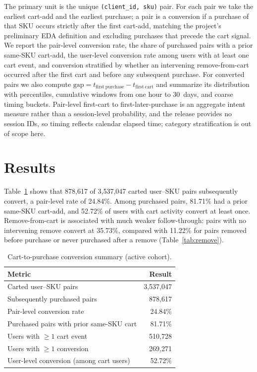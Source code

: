 \documentclass[11pt]{article}
\begin{document}
The primary unit is the unique \texttt{(client\_id, sku)} pair. For each pair we take the earliest cart-add and the earliest purchase; a pair is a conversion if a purchase of that SKU occurs strictly after the first cart-add, matching the project's preliminary EDA definition and excluding purchases that precede the cart signal. We report the pair-level conversion rate, the share of purchased pairs with a prior same-SKU cart-add, the user-level conversion rate among users with at least one cart event, and conversion stratified by whether an intervening remove-from-cart occurred after the first cart and before any subsequent purchase. For converted pairs we also compute $\mathrm{gap}=t_{\mathrm{first\ purchase}}-t_{\mathrm{first\ cart}}$ and summarize its distribution with percentiles, cumulative windows from one hour to 30~days, and coarse timing buckets. Pair-level first-cart to first-later-purchase is an aggregate intent measure rather than a session-level probability, and the release provides no session IDs, so timing reflects calendar elapsed time; category stratification is out of scope here.

\section{Results}
Table~\ref{tab:conversion} shows that 878,617 of 3,537,047 carted user--SKU pairs subsequently convert, a pair-level rate of 24.84\%. Among purchased pairs, 81.71\% had a prior same-SKU cart-add, and 52.72\% of users with cart activity convert at least once. Remove-from-cart is associated with much weaker follow-through: pairs with no intervening remove convert at 35.73\%, compared with 11.22\% for pairs removed before purchase or never purchased after a remove (Table~\ref{tab:remove}).

\begin{table}[h]
\centering
\caption{Cart-to-purchase conversion summary (active cohort).}
\label{tab:conversion}
\begin{tabular}{lr}
\toprule
Metric & Result \\
\midrule
Carted user--SKU pairs & 3,537,047 \\
Subsequently purchased pairs & 878,617 \\
Pair-level conversion rate & 24.84\% \\
Purchased pairs with prior same-SKU cart & 81.71\% \\
Users with $\geq 1$ cart event & 510,728 \\
Users with $\geq 1$ conversion & 269,271 \\
User-level conversion (among cart users) & 52.72\% \\
\bottomrule
\end{tabular}
\end{table}
\end{document}
